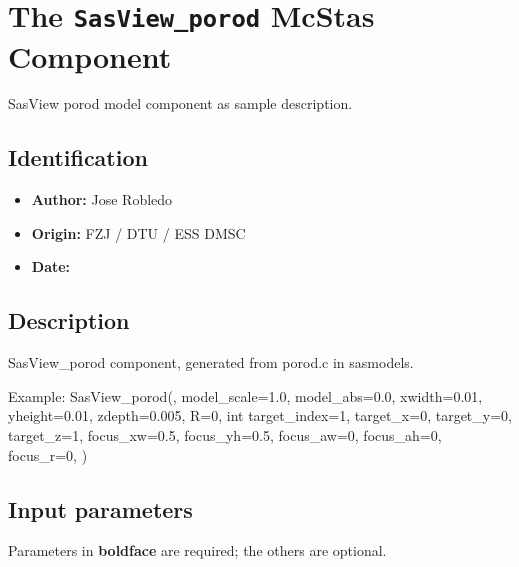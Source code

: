 \section{The \texttt{SasView\_porod} McStas Component}
SasView porod model component as sample description.

\subsection*{Identification}
\begin{itemize}
  \item \textbf{Author:} Jose Robledo
  \item \textbf{Origin:} FZJ / DTU / ESS DMSC
  \item \textbf{Date:} 
\end{itemize}

\subsection*{Description}
SasView\_porod component, generated from porod.c in sasmodels.

Example: SasView\_porod(, model\_scale=1.0, model\_abs=0.0, xwidth=0.01, yheight=0.01, zdepth=0.005, R=0, int target\_index=1, target\_x=0, target\_y=0, target\_z=1, focus\_xw=0.5, focus\_yh=0.5, focus\_aw=0, focus\_ah=0, focus\_r=0, )

\subsection*{Input parameters}
Parameters in \textbf{boldface} are required; the others are optional.

